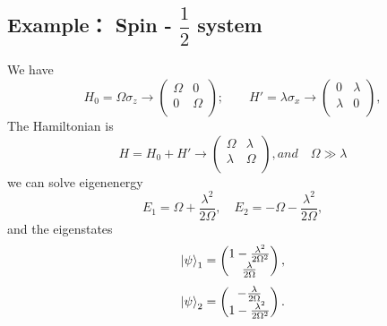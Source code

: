 \documentclass[11pt,a4paper]{report}
\begin{document}
\subsection*{Example： Spin - $\dfrac{1}{2}$ system}
We have
\begin{equation*}
    H_0=\Omega \sigma_z \to \begin{pmatrix}
     \Omega & 0 \\
     0 & \Omega \\   
    \end{pmatrix} ; \hspace{2em}
    H'=\lambda \sigma_x \to \begin{pmatrix}
        0 & \lambda \\
        \lambda & 0 \\   
       \end{pmatrix} ,
\end{equation*}
The Hamiltonian is
\begin{equation*}
    H=H_0+H' \to \begin{pmatrix}
        \Omega & \lambda \\
        \lambda & \Omega \\
    \end{pmatrix} , and \hspace{1em} \Omega \gg \lambda
\end{equation*}
we can solve eigenenergy 
\begin{equation*}
    E_1=\Omega + \frac{\lambda^2}{2\Omega} , \hspace{1em} E_2=-\Omega - \frac{\lambda^2}{2\Omega} ,
\end{equation*}
and the eigenstates
\begin{equation*}
    \ket{\psi}_1= \begin{pmatrix}
        1-\frac{\lambda^2}{2\Omega^2} \\
        \frac{\lambda}{2\Omega} \\ 
    \end{pmatrix} ,
\end{equation*}
\begin{equation*}
    \ket{\psi}_2= \begin{pmatrix}
        -\frac{\lambda}{2\Omega} \\ 
        1-\frac{\lambda^2}{2\Omega^2} \\
    \end{pmatrix} .
\end{equation*}
\end{document}
